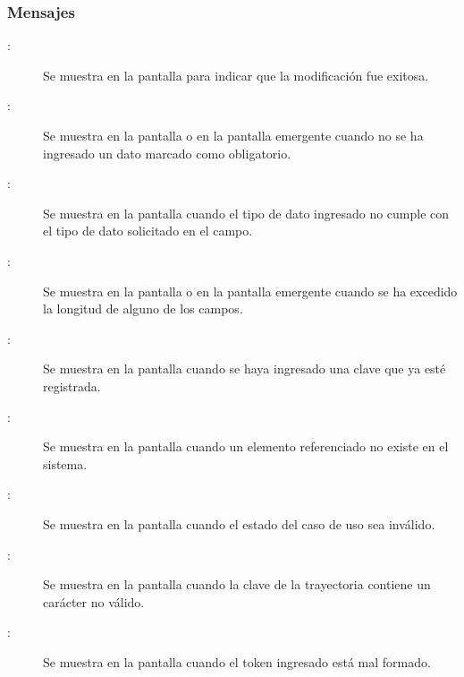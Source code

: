 \subsubsection{Mensajes}

	
\begin{description}
	\item[ :] Se muestra en la pantalla  para indicar que la modificación fue exitosa.
	\item[:] Se muestra en la pantalla  o en la pantalla emergente  cuando no se ha ingresado un dato marcado como obligatorio.
	\item[:] Se muestra en la pantalla  cuando el tipo de dato ingresado no cumple con el tipo de dato solicitado en el campo.
	\item[:] Se muestra en la pantalla  o en la pantalla emergente  cuando se ha excedido la longitud de alguno de los campos.
	\item[:] Se muestra en la pantalla  cuando se haya ingresado una clave que ya esté registrada.
	\item[:] Se muestra en la pantalla  cuando un elemento referenciado no existe en el sistema.
	\item[:] Se muestra en la pantalla  cuando el estado del caso de uso sea inválido.
	\item[:] Se muestra en la pantalla  cuando la clave de la trayectoria contiene un carácter no válido.
	\item[:] Se muestra en la pantalla  cuando el token ingresado está mal formado.
\end{description}
